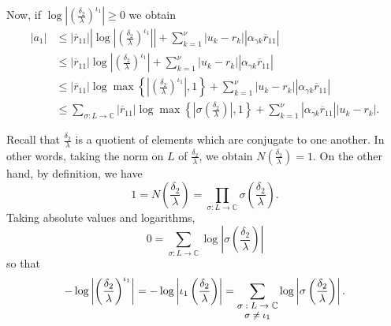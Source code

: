 Now, if $\log\left|\left(\frac{\delta_2}{\lambda}\right)^{\iota_1}\right| \geq 0$ we obtain
\begin{align*}
|a_1|	& \leq |\overline{r}_{11}|\left|\log\left|\left(\frac{\delta_2}{\lambda}\right)^{\iota_1}\right|\right| + \sum_{k=1}^{\nu}|u_k-r_k||\alpha_{\gamma k}\overline{r}_{11}|\\
		& \leq |\overline{r}_{11}|\log\left|\left(\frac{\delta_2}{\lambda}\right)^{\iota_1}\right| + \sum_{k=1}^{\nu}|u_k-r_k||\alpha_{\gamma k}\overline{r}_{11}|\\
		& \leq |\overline{r}_{11}|\log\max\left\{\left|\left(\frac{\delta_2}{\lambda}\right)^{\iota_1}\right|, 1 \right\} + \sum_{k=1}^{\nu}|u_k-r_k||\alpha_{\gamma k}\overline{r}_{11}|\\
		& \leq \sum_{\sigma: L \to \mathbb{C}}|\overline{r}_{11}|\log\max \left\{\left|\sigma \left(\frac{\delta_2}{\lambda}\right)\right|,1\right\} + \sum_{k=1}^{\nu}|\alpha_{\gamma k}\overline{r}_{11}||u_k-r_k|.
\end{align*}

Recall that $\frac{\delta_2}{\lambda}$ is a quotient of elements which are conjugate to one another. In other words, taking the norm on $L$ of $\frac{\delta_2}{\lambda}$, we obtain $N\left(\frac{\delta_2}{\lambda}\right) = 1.$ On the other hand, by definition, we have 
\[1 = N\left(\frac{\delta_2}{\lambda}\right) = \prod_{\sigma: L \to \mathbb{C}} \sigma \left(\frac{\delta_2}{\lambda}\right).\]
Taking absolute values and logarithms, 
\[0 = \sum_{\sigma: L \to \mathbb{C}} \log\left|\sigma \left(\frac{\delta_2}{\lambda}\right)\right|\]
so that
\[-\log\left|\left(\frac{\delta_2}{\lambda}\right)^{\iota_1}\right| = -\log\left|\iota_1 \left(\frac{\delta_2}{\lambda}\right)\right| = \sum_{\shortstack{\footnotesize $\sigma: L \to \mathbb{C} $\\ \footnotesize $ \sigma \neq \iota_1$}} \log\left|\sigma \left(\frac{\delta_2}{\lambda}\right)\right|.\]

